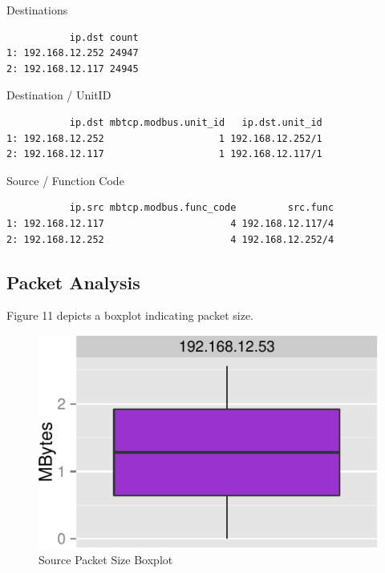\documentclass[11pt,]{article}
\begin{document}
Destinations

\begin{verbatim}
           ip.dst count
1: 192.168.12.252 24947
2: 192.168.12.117 24945
\end{verbatim}

\newpage

Destination / UnitID

\begin{verbatim}
           ip.dst mbtcp.modbus.unit_id   ip.dst.unit_id
1: 192.168.12.252                    1 192.168.12.252/1
2: 192.168.12.117                    1 192.168.12.117/1
\end{verbatim}

Source / Function Code

\begin{verbatim}
           ip.src mbtcp.modbus.func_code         src.func
1: 192.168.12.117                      4 192.168.12.117/4
2: 192.168.12.252                      4 192.168.12.252/4
\end{verbatim}

\subsection{Packet Analysis}\label{packet-analysis}

Figure 11 depicts a boxplot indicating packet size.

\begin{figure}

{\centering \includegraphics{thesis_files/figure-latex/unnamed-chunk-19-1} 

}

\caption{Source Packet Size Boxplot}\label{fig:unnamed-chunk-19}
\end{figure}
\end{document}
